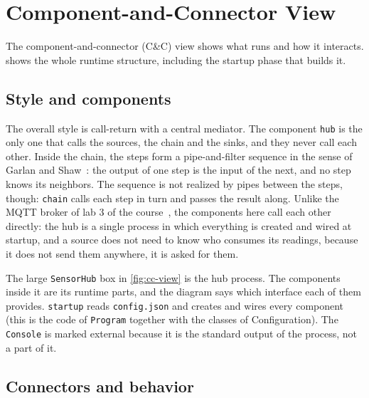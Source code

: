 \documentclass[../main-en.tex]{subfiles}
\begin{document}
\section{Component-and-Connector View}
\style
\label{sec:cc-view}

The component-and-connector (C\&C) view shows what runs and how it
interacts.  shows the whole runtime structure, including
the startup phase that builds it.


\subsection{Style and components}

The overall style is call-return with a central mediator. The component
\texttt{hub} is the only one that calls the sources, the chain and the
sinks, and they never call each other. Inside the chain, the steps form a
pipe-and-filter sequence in the sense of Garlan and
Shaw~\cite{garlan_shaw_1994}: the output of one step is the input of the
next, and no step knows its neighbors. The sequence is not realized by
pipes between the steps, though: \texttt{chain} calls each step in turn and
passes the result along. Unlike the MQTT broker of lab 3 of the
course~\cite{marsic_mqtt_nodate}, the components here call each other
directly: the hub is a single process in which everything is created and
wired at startup, and a source does not need to know who consumes its
readings, because it does not send them anywhere, it is asked for them.

The large \texttt{SensorHub} box in \cref{fig:cc-view} is the hub process.
The components inside it are its runtime parts, and the diagram says which
interface each of them provides. \texttt{startup} reads \texttt{config.json}
and creates and wires every component (this is the code of \texttt{Program}
together with the classes of Configuration). The \texttt{Console} is marked
external because it is the standard output of the process, not a part of it.

\subsection{Connectors and behavior}
\end{document}
